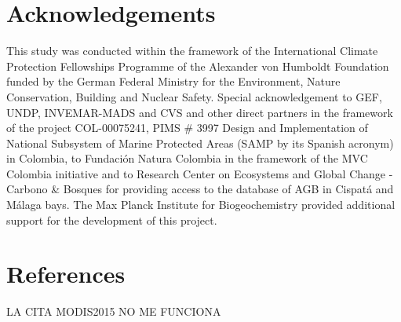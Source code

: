 \documentclass[review, authoryear]{elsarticle}   	%
\begin{document}
\section*{Acknowledgements}
This study was conducted within the framework of the International Climate Protection Fellowships Programme of the Alexander von Humboldt Foundation funded by the German Federal Ministry for the Environment, Nature Conservation, Building and Nuclear Safety.
Special acknowledgement to GEF, UNDP, INVEMAR-MADS and CVS and other direct partners in the framework of the project COL-00075241, PIMS \# 3997 Design and Implementation of National Subsystem of Marine Protected Areas (SAMP by its Spanish acronym) in Colombia, to Fundaci\'on Natura Colombia in the framework of the MVC Colombia initiative and to Research Center on Ecosystems and Global Change -Carbono \& Bosques for providing access to the database of AGB in Cispat\'a and M\'alaga bays.
The Max Planck Institute for Biogeochemistry provided additional support for the development of this project. 




\section*{References}


%

\newpage 




LA CITA MODIS2015 NO ME FUNCIONA
\end{document}
